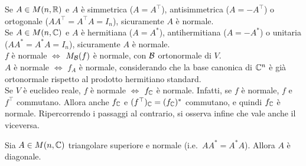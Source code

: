 \begin{remark}\nl
	\li Se $A \in M(n, \mathbb R)$ e $A$ è simmetrica ($A = A^\top$), antisimmetrica ($A = -A^\top$) o
	ortogonale ($A A^\top = A^\top A = I_n$), sicuramente $A$ è normale. \\
	\li Se $A \in M(n, \mathbb C)$ e $A$ è hermitiana ($A = A^*$), antihermitiana ($A = -A^*$) o
	unitaria ($A A^* = A^* A = I_n$), sicuramente $A$ è normale. \\
	\li $f$ è normale $\iff$ $M_{\mathcal{B}}(f)$ è normale, con $\mathcal{B}$ ortonormale di $V$. \\
	\li $A$ è normale $\iff$ $f_A$ è normale, considerando che la base canonica di $\mathbb C^n$ è già
	ortonormale rispetto al prodotto hermitiano standard. \\
	\li Se $V$ è euclideo reale, $f$ è normale $\iff$ $f_\mathbb C$ è normale. Infatti, se $f$ è normale, $f$ e $f^\top$
	commutano. Allora anche $f_\mathbb C$ e $(f^\top)_\mathbb C = (f_\mathbb C)^*$ commutano, e quindi $f_\mathbb C$ è normale.
	Ripercorrendo i passaggi al contrario, si osserva infine che vale anche il viceversa.
\end{remark}

\setcounter{lemma}{0}

\begin{lemma}
	Sia $A \in M(n, \mathbb C)$ triangolare superiore e normale (i.e.~$A A^* = A^* A$). Allora
	$A$ è diagonale.
\end{lemma}

